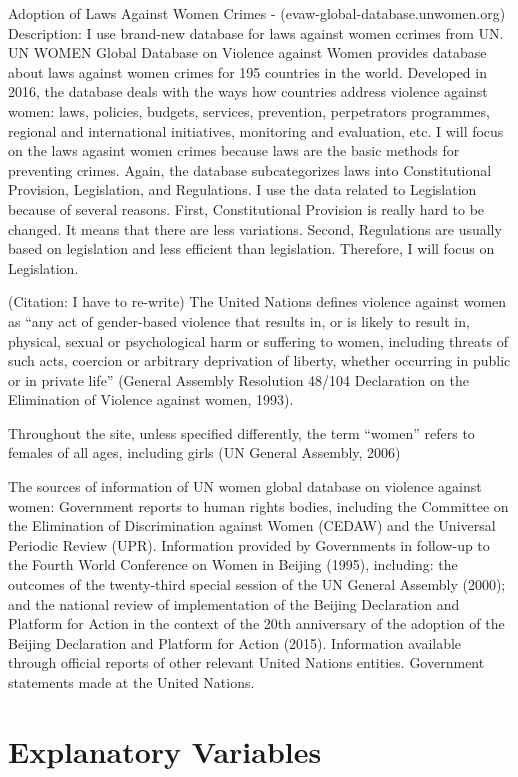 \documentclass[]{article}
\begin{document}
Adoption of Laws Against Women Crimes -
(evaw-global-database.unwomen.org) Description: I use brand-new database
for laws against women ccrimes from UN. UN WOMEN Global Database on
Violence against Women provides database about laws against women crimes
for 195 countries in the world. Developed in 2016, the database deals
with the ways how countries address violence against women: laws,
policies, budgets, services, prevention, perpetrators programmes,
regional and international initiatives, monitoring and evaluation, etc.
I will focus on the laws agasint women crimes because laws are the basic
methods for preventing crimes. Again, the database subcategorizes laws
into Constitutional Provision, Legislation, and Regulations. I use the
data related to Legislation because of several reasons. First,
Constitutional Provision is really hard to be changed. It means that
there are less variations. Second, Regulations are usually based on
legislation and less efficient than legislation. Therefore, I will focus
on Legislation.

(Citation: I have to re-write) The United Nations defines violence
against women as ``any act of gender-based violence that results in, or
is likely to result in, physical, sexual or psychological harm or
suffering to women, including threats of such acts, coercion or
arbitrary deprivation of liberty, whether occurring in public or in
private life'' (General Assembly Resolution 48/104 Declaration on the
Elimination of Violence against women, 1993).

Throughout the site, unless specified differently, the term ``women''
refers to females of all ages, including girls (UN General Assembly,
2006)

The sources of information of UN women global database on violence
against women: Government reports to human rights bodies, including the
Committee on the Elimination of Discrimination against Women (CEDAW) and
the Universal Periodic Review (UPR). Information provided by Governments
in follow-up to the Fourth World Conference on Women in Beijing (1995),
including: the outcomes of the twenty-third special session of the UN
General Assembly (2000); and the national review of implementation of
the Beijing Declaration and Platform for Action in the context of the
20th anniversary of the adoption of the Beijing Declaration and Platform
for Action (2015). Information available through official reports of
other relevant United Nations entities. Government statements made at
the United Nations.

\section{Explanatory Variables}\label{explanatory-variables}
\end{document}
